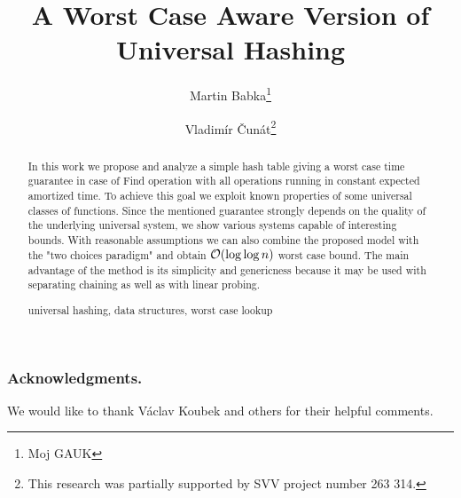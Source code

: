 \documentclass[runningheads,a4paper]{llncs}
\newcommand{\keywords}[1]{\par\addvspace\baselineskip
\noindent\keywordname\enspace\ignorespaces#1}
\begin{document}
\mainmatter

\author{Martin Babka\thanks{Moj GAUK} \and Vladimír Čunát\thanks{This research was partially supported by SVV project number 263 314.}}

\title{A Worst Case Aware Version of Universal Hashing}


\maketitle

\begin{abstract}
In this work we propose and analyze a simple hash table giving a worst case time guarantee in case of Find operation with all operations running in constant expected amortized time.
To achieve this goal we exploit known properties of some universal classes of functions.
Since the mentioned guarantee strongly depends on the quality of the underlying universal system, we show various systems capable of interesting bounds.
With reasonable assumptions we can also combine the proposed model with the "two choices paradigm" and obtain $\mathcal{O}(\log \log n)$ worst case bound.
The main advantage of the method is its simplicity and genericness because it may be used with separating chaining as well as with linear probing.

\keywords{universal hashing, data structures, worst case lookup}
\end{abstract}






\subsubsection*{Acknowledgments.}
We would like to thank Václav Koubek and others for their helpful comments.



\clearpage


\end{document}
